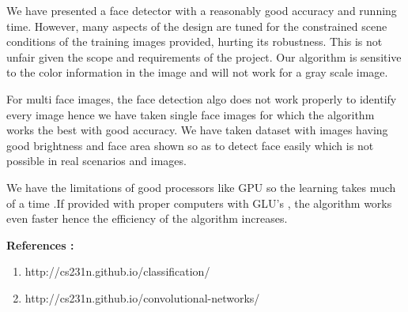 \documentclass{article} %
\begin{document}
\noindent                We have presented a face detector with a reasonably good accuracy and running time. However, many aspects of the design are tuned for the constrained scene conditions of the training images provided, hurting its robustness. This is not unfair given the scope and requirements of the project. Our algorithm is sensitive to the color information in the image and will not work for a gray scale image.

\noindent 

\noindent                For multi face images, the face detection algo does not work properly to identify every image hence we have taken single face images for which the algorithm works the best with good accuracy. We have taken dataset with images having good brightness and face area shown so as to detect face easily which is not possible in real scenarios and images.

\noindent 

\noindent                 We have the limitations of good processors like GPU so the learning takes much of a time .If provided with proper computers with GLU's , the algorithm works even faster hence the efficiency of the algorithm increases. 

\noindent 

\noindent 

\noindent 

\noindent 

\noindent 

\noindent 

\noindent 

\noindent 

\noindent 

\noindent 

\noindent 

\noindent 

\noindent 

\noindent 

\noindent 

\noindent 

\noindent 

\noindent 

\noindent \textbf{References :}

\begin{enumerate}
\item \textbf{ }http://cs231n.github.io/classification/

\item  http://cs231n.github.io/convolutional-networks/
\end{enumerate}
\end{document}
